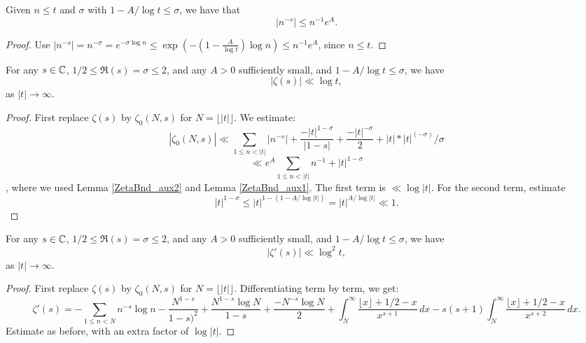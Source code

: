 \begin{lemma}\label{ZetaBnd_aux2}\leanok
Given $n ≤ t$ and $\sigma$ with $1-A/\log t \le \sigma$, we have
that
$$
|n^{-s}| \le n^{-1} e^A.
$$
\end{lemma}


\begin{proof}
Use $|n^{-s}| = n^{-\sigma}
= e^{-\sigma \log n}
\le
\exp(-\left(1-\frac{A}{\log t}\right)\log n)
\le
n^{-1} e^A$,
since $n\le t$.
\end{proof}


\begin{lemma}[ZetaUpperBnd]\label{ZetaUpperBnd}\leanok
For any $s\in \C$, $1/2 \le \Re(s)=\sigma\le 2$,
and any $A>0$ sufficiently small, and $1-A/\log t \le \sigma$, we have
$$
|\zeta(s)| \ll \log t,
$$
as $|t|\to\infty$.
\end{lemma}


\begin{proof}
First replace $\zeta(s)$ by $\zeta_0(N,s)$ for $N = \lfloor |t| \rfloor$.
We estimate:
$$
|\zeta_0(N,s)| \ll
\sum_{1\le n < |t|} |n^{-s}|
+
\frac{- |t|^{1-\sigma}}{|1-s|} + \frac{-|t|^{-\sigma}}{2} +
|t| * |t| ^ (-σ) / σ
$$
$$
\ll
e^A \sum_{1\le n < |t|} n^{-1}
+|t|^{1-\sigma}
$$
,
where we used Lemma \ref{ZetaBnd_aux2} and Lemma \ref{ZetaBnd_aux1}.
The first term is $\ll \log |t|$.
For the second term, estimate
$$
|t|^{1-\sigma}
\le |t|^{1-(1-A/\log |t|)}
= |t|^{A/\log |t|} \ll 1.
$$
\end{proof}


\begin{lemma}[ZetaDerivUpperBnd]\label{ZetaDerivUpperBnd}\leanok
For any $s\in \C$, $1/2 \le \Re(s)=\sigma\le 2$,
and any $A>0$ sufficiently small, and $1-A/\log t \le \sigma$, we have
$$
|\zeta'(s)| \ll \log^2 t,
$$
as $|t|\to\infty$.
\end{lemma}


\begin{proof}
First replace $\zeta(s)$ by $\zeta_0(N,s)$ for $N = \lfloor |t| \rfloor$.
Differentiating term by term, we get:
$$
\zeta'(s) = -\sum_{1\le n < N} n^{-s} \log n
-
\frac{N^{1 - s}}{1 - s)^2} + \frac{N^{1 - s} \log N} {1 - s}
+ \frac{-N^{-s}\log N}{2} +
\int_N^\infty \frac{\lfloor x\rfloor + 1/2 - x}{x^{s+1}} \, dx
-
s(s+1) \int_N^\infty \frac{\lfloor x\rfloor + 1/2 - x}{x^{s+2}} \, dx
.
$$
Estimate as before, with an extra factor of $\log |t|$.
\end{proof}


